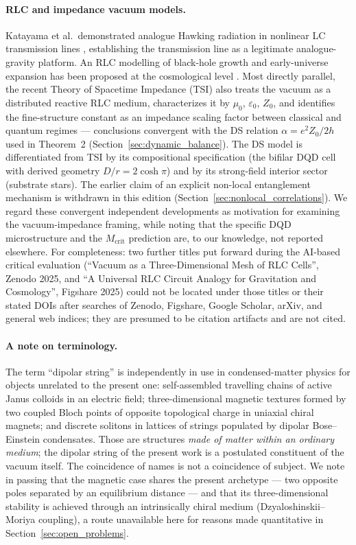 \documentclass[11pt,a4paper]{article}
\theoremstyle{plain}
\theoremstyle{remark}
\begin{document}
\paragraph{RLC and impedance vacuum models.} Katayama et al.\ demonstrated analogue Hawking radiation in nonlinear LC transmission lines \cite{katayama2021}, establishing the transmission line as a legitimate analogue-gravity platform. An RLC modelling of black-hole growth and early-universe expansion has been proposed at the cosmological level \cite{rlcbh2023}. Most directly parallel, the recent Theory of Spacetime Impedance (TSI) \cite{tsi2026} also treats the vacuum as a distributed reactive RLC medium, characterizes it by $\mu_0$, $\varepsilon_0$, $Z_0$, and identifies the fine-structure constant as an impedance scaling factor between classical and quantum regimes --- conclusions convergent with the DS relation $\alpha = e^2 Z_0/2h$ used in Theorem~2 (Section~\ref{sec:dynamic_balance}). The DS model is differentiated from TSI by its compositional specification (the bifilar DQD cell with derived geometry $D/r = 2\cosh\pi$) and by its strong-field interior sector (substrate stars). The earlier claim of an explicit non-local entanglement mechanism is withdrawn in this edition (Section~\ref{sec:nonlocal_correlations}). We regard these convergent independent developments as motivation for examining the vacuum-impedance framing, while noting that the specific DQD microstructure and the $M_{\text{crit}}$ prediction are, to our knowledge, not reported elsewhere. For completeness: two further titles put forward during the AI-based critical evaluation (``Vacuum as a Three-Dimensional Mesh of RLC Cells'', Zenodo 2025, and ``A Universal RLC Circuit Analogy for Gravitation and Cosmology'', Figshare 2025) could not be located under those titles or their stated DOIs after searches of Zenodo, Figshare, Google Scholar, arXiv, and general web indices; they are presumed to be citation artifacts and are not cited.

\paragraph{A note on terminology.} The term ``dipolar string'' is independently in use in condensed-matter physics for objects unrelated to the present one: self-assembled travelling chains of active Janus colloids in an electric field; three-dimensional magnetic textures formed by two coupled Bloch points of opposite topological charge in uniaxial chiral magnets; and discrete solitons in lattices of strings populated by dipolar Bose--Einstein condensates. Those are structures \emph{made of matter within an ordinary medium}; the dipolar string of the present work is a postulated constituent of the vacuum itself. The coincidence of names is not a coincidence of subject. We note in passing that the magnetic case shares the present archetype --- two opposite poles separated by an equilibrium distance --- and that its three-dimensional stability is achieved through an intrinsically chiral medium (Dzyaloshinskii--Moriya coupling), a route unavailable here for reasons made quantitative in Section~\ref{sec:open_problems}.
\end{document}
